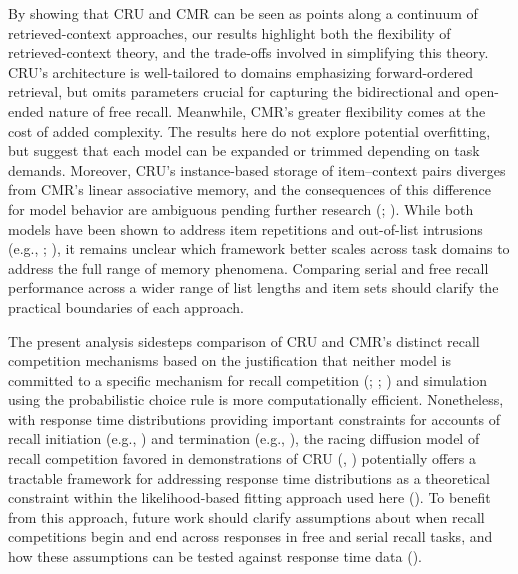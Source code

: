 \documentclass[
  man,
  floatsintext,
  longtable,
  nolmodern,
  notxfonts,
  notimes,
  draftfirst,
  colorlinks=true,linkcolor=blue,citecolor=blue,urlcolor=blue]{apa7}
\begin{document}
By showing that CRU and CMR can be seen as points along a continuum of
retrieved-context approaches, our results highlight both the flexibility
of retrieved-context theory, and the trade-offs involved in simplifying
this theory. CRU's architecture is well-tailored to domains emphasizing
forward-ordered retrieval, but omits parameters crucial for capturing
the bidirectional and open-ended nature of free recall. Meanwhile, CMR's
greater flexibility comes at the cost of added complexity. The results
here do not explore potential overfitting, but suggest that each model
can be expanded or trimmed depending on task demands. Moreover, CRU's
instance-based storage of item--context pairs diverges from CMR's linear
associative memory, and the consequences of this difference for model
behavior are ambiguous pending further research
(;
). While both models have
been shown to address item repetitions and out-of-list intrusions (e.g.,
;
), it remains
unclear which framework better scales across task domains to address the
full range of memory phenomena. Comparing serial and free recall
performance across a wider range of list lengths and item sets should
clarify the practical boundaries of each approach.

The present analysis sidesteps comparison of CRU and CMR's distinct
recall competition mechanisms based on the justification that neither
model is committed to a specific mechanism for recall competition
(;
;
) and simulation
using the probabilistic choice rule is more computationally efficient.
Nonetheless, with response time distributions providing important
constraints for accounts of recall initiation (e.g.,
) and termination
(e.g., ), the racing diffusion model of recall competition favored in
demonstrations of CRU (,
) potentially offers a tractable
framework for addressing response time distributions as a theoretical
constraint within the likelihood-based fitting approach used here
(). To benefit
from this approach, future work should clarify assumptions about when
recall competitions begin and end across responses in free and serial
recall tasks, and how these assumptions can be tested against response
time data ().
\end{document}
